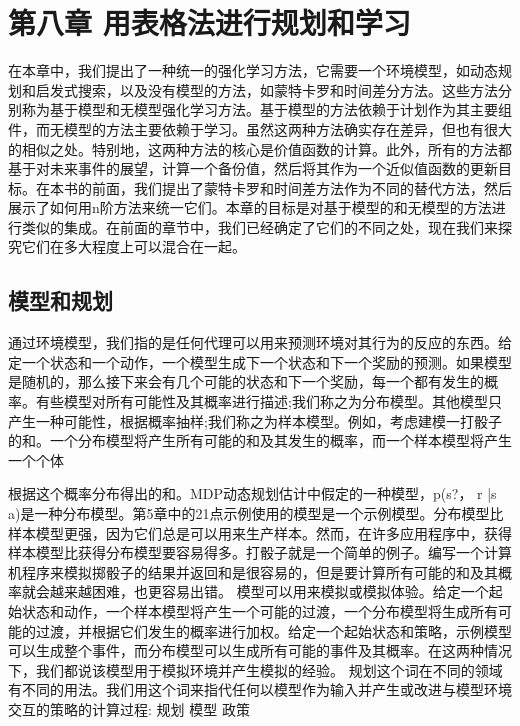 \chapter{第八章 用表格法进行规划和学习}

\begin{summary}
	在本章中，我们提出了一种统一的强化学习方法，它需要一个环境模型，如动态规划和启发式搜索，以及没有模型的方法，如蒙特卡罗和时间差分方法。这些方法分别称为基于模型和无模型强化学习方法。基于模型的方法依赖于计划作为其主要组件，而无模型的方法主要依赖于学习。虽然这两种方法确实存在差异，但也有很大的相似之处。特别地，这两种方法的核心是价值函数的计算。此外，所有的方法都基于对未来事件的展望，计算一个备份值，然后将其作为一个近似值函数的更新目标。在本书的前面，我们提出了蒙特卡罗和时间差方法作为不同的替代方法，然后展示了如何用n阶方法来统一它们。本章的目标是对基于模型的和无模型的方法进行类似的集成。在前面的章节中，我们已经确定了它们的不同之处，现在我们来探究它们在多大程度上可以混合在一起。	
\end{summary}

\section{模型和规划}

通过环境模型，我们指的是任何代理可以用来预测环境对其行为的反应的东西。给定一个状态和一个动作，一个模型生成下一个状态和下一个奖励的预测。如果模型是随机的，那么接下来会有几个可能的状态和下一个奖励，每一个都有发生的概率。有些模型对所有可能性及其概率进行描述;我们称之为分布模型。其他模型只产生一种可能性，根据概率抽样;我们称之为样本模型。例如，考虑建模一打骰子的和。一个分布模型将产生所有可能的和及其发生的概率，而一个样本模型将产生一个个体

根据这个概率分布得出的和。MDP动态规划估计中假定的一种模型，p(s?， r |s a)是一种分布模型。第5章中的21点示例使用的模型是一个示例模型。分布模型比样本模型更强，因为它们总是可以用来生产样本。然而，在许多应用程序中，获得样本模型比获得分布模型要容易得多。打骰子就是一个简单的例子。编写一个计算机程序来模拟掷骰子的结果并返回和是很容易的，但是要计算所有可能的和及其概率就会越来越困难，也更容易出错。
模型可以用来模拟或模拟体验。给定一个起始状态和动作，一个样本模型将产生一个可能的过渡，一个分布模型将生成所有可能的过渡，并根据它们发生的概率进行加权。给定一个起始状态和策略，示例模型可以生成整个事件，而分布模型可以生成所有可能的事件及其概率。在这两种情况下，我们都说该模型用于模拟环境并产生模拟的经验。
规划这个词在不同的领域有不同的用法。我们用这个词来指代任何以模型作为输入并产生或改进与模型环境交互的策略的计算过程:
规划
模型 					政策

